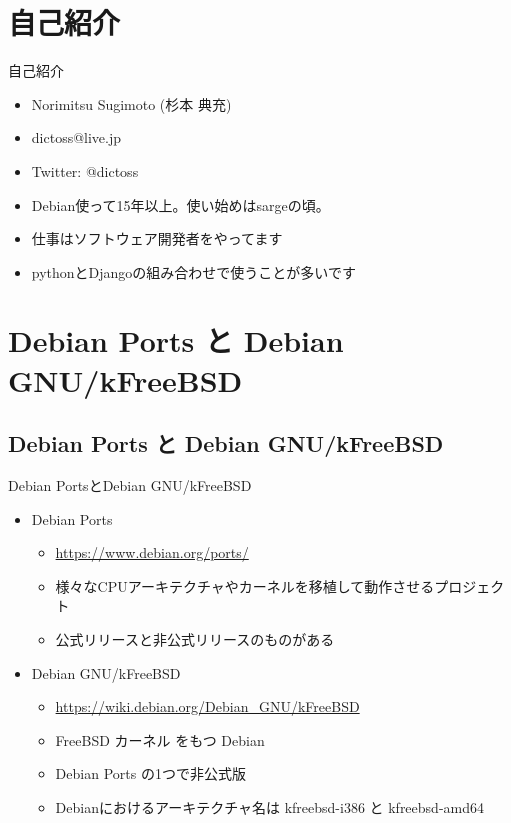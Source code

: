 \section{自己紹介}

\begin{frame}{自己紹介}
  \begin{itemize}
  \item Norimitsu Sugimoto (杉本 典充)
  \item dictoss@live.jp
  \item Twitter: @dictoss
  \item Debian使って15年以上。使い始めはsargeの頃。
  \item 仕事はソフトウェア開発者をやってます
  \item pythonとDjangoの組み合わせで使うことが多いです
  \end{itemize}
\end{frame}


\section{Debian Ports と Debian GNU/kFreeBSD}

\subsection{Debian Ports と Debian GNU/kFreeBSD}
\begin{frame}{Debian PortsとDebian GNU/kFreeBSD}
  \begin{itemize}
  \item Debian Ports
    \begin{itemize}
    \item \url{https://www.debian.org/ports/}
    \item 様々なCPUアーキテクチャやカーネルを移植して動作させるプロジェクト
    \item 公式リリースと非公式リリースのものがある
    \end{itemize}
  \item Debian GNU/kFreeBSD
    \begin{itemize}
    \item \url{https://wiki.debian.org/Debian_GNU/kFreeBSD}
    \item FreeBSD カーネル をもつ Debian
    \item Debian Ports の1つで非公式版
    \item Debianにおけるアーキテクチャ名は kfreebsd-i386 と kfreebsd-amd64
    \end{itemize}
  \end{itemize}
\end{frame}

